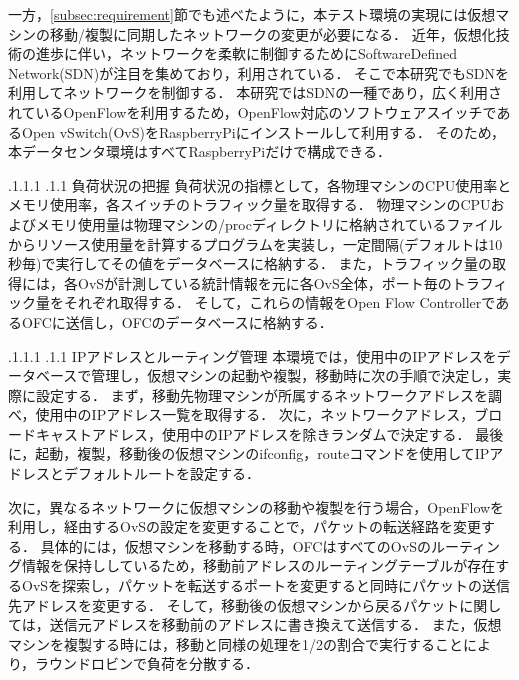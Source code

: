 \documentclass[a4paper, twocolumn]{jarticle}
\makeatletter
\def\subsection{\@startsection{subsection}{1}{\z@}%
 {.1\Cvs \@plus.1\Cdp \@minus.1\Cdp}%
 {.1\Cvs \@plus.1\Cdp}%
 {\normalfont\normalsize\bfseries}}
\makeatother
\begin{document}
一方，\ref{subsec:requirement}節でも述べたように，本テスト環境の実現には仮想マシンの移動/複製に同期したネットワークの変更が必要になる．
近年，仮想化技術の進歩に伴い，ネットワークを柔軟に制御するためにSoftwareDefined Network(SDN)\cite{sdn}が注目を集めており，利用されている．
そこで本研究でもSDNを利用してネットワークを制御する．
本研究ではSDNの一種であり，広く利用されているOpenFlow\cite{opf}を利用するため，OpenFlow対応のソフトウェアスイッチであるOpen vSwitch(OvS)をRaspberryPiにインストールして利用する．
そのため，本データセンタ環境はすべてRaspberryPiだけで構成できる．

\subsection{負荷状況の把握}
負荷状況の指標として，各物理マシンのCPU使用率とメモリ使用率，各スイッチのトラフィック量を取得する．
物理マシンのCPUおよびメモリ使用量は物理マシンの/procディレクトリに格納されているファイルからリソース使用量を計算するプログラムを実装し，一定間隔(デフォルトは10秒毎)で実行してその値をデータベースに格納する．
また，トラフィック量の取得には，各OvSが計測している統計情報を元に各OvS全体，ポート毎のトラフィック量をそれぞれ取得する．
そして，これらの情報をOpen Flow ControllerであるOFCに送信し，OFCのデータベースに格納する．

\subsection{IPアドレスとルーティング管理}
本環境では，使用中のIPアドレスをデータベースで管理し，仮想マシンの起動や複製，移動時に次の手順で決定し，実際に設定する．
まず，移動先物理マシンが所属するネットワークアドレスを調べ，使用中のIPアドレス一覧を取得する．
次に，ネットワークアドレス，ブロードキャストアドレス，使用中のIPアドレスを除きランダムで決定する．
最後に，起動，複製，移動後の仮想マシンのifconfig，routeコマンドを使用してIPアドレスとデフォルトルートを設定する．

次に，異なるネットワークに仮想マシンの移動や複製を行う場合，OpenFlowを利用し，経由するOvSの設定を変更することで，パケットの転送経路を変更する．
具体的には，仮想マシンを移動する時，OFCはすべてのOvSのルーティング情報を保持ししているため，移動前アドレスのルーティングテーブルが存在するOvSを探索し，パケットを転送するポートを変更すると同時にパケットの送信先アドレスを変更する．
そして，移動後の仮想マシンから戻るパケットに関しては，送信元アドレスを移動前のアドレスに書き換えて送信する．
また，仮想マシンを複製する時には，移動と同様の処理を1/2の割合で実行することにより，ラウンドロビンで負荷を分散する．
\end{document}
